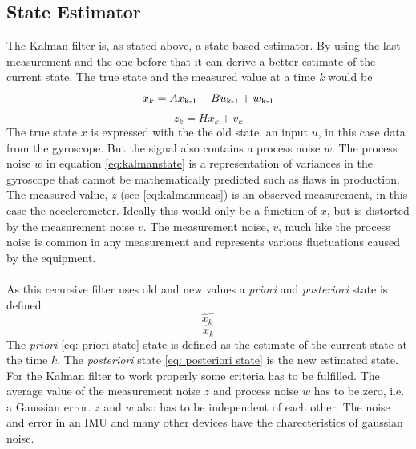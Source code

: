 \documentclass[a4paper,11pt]{kth-mag}
\begin{document}
\subsection{State Estimator}
The Kalman filter is, as stated above, a state based estimator. By using the last measurement and the one before that it can derive a better estimate of the current state. The true state and the measured value at a time \textit{k} would be
\begin{equation}\label{eq:kalmanstate}
x_k = Ax\textsubscript{k-1}+Bu\textsubscript{k-1}+w\textsubscript{k-1}
\end{equation}
\begin{equation} \label{eq:kalmanmeas}
z_k = Hx_k + v_k
\end{equation}
The true state $x$ is expressed with the the old state, an input $u$, in this case data from the gyroscope. But the signal also contains a process noise $w$. The process noise $w$ in equation \eqref{eq:kalmanstate} is a representation of variances in the gyroscope that cannot be mathematically predicted such as flaws in production. 
The measured value, $z$ (see \eqref{eq:kalmanmeas}) is an observed measurement, in this case the accelerometer. Ideally this would only be a function of $x$, but is distorted by the measurement noise $v$.
The measurement noise, $v$, much like the process noise is common in any measurement and represents various fluctuations caused by the equipment.
\\ \\
As this recursive filter uses old and new values a \textit{priori} and \textit{posteriori} state is defined
\begin{equation} \label{eq: priori state}
\hat{x}^-_k
\end{equation}
\begin{equation} \label{eq: posteriori state}
\hat{x}_k
\end{equation}
The \textit{priori} \eqref{eq: priori state} state is defined as the estimate of the current state at the time $k$. The \textit{posteriori} state \eqref{eq: posteriori state} is the new estimated state.
For the Kalman filter to work properly some criteria has to be fulfilled. The average value of the measurement noise $z$ and process noise $w$ has to be zero, i.e. a Gaussian error. $z$ and $w$ also has to be independent of  each other. The noise and error in an IMU and many other devices have the charecteristics of gaussian noise.
\end{document}
